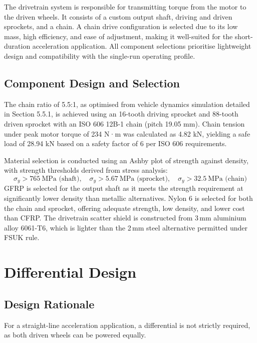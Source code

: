 \documentclass[11pt, a4paper]{report}
\numberwithin{equation}{section}
\begin{document}
\begin{refsection}
The drivetrain system is responsible for transmitting torque from the motor to the driven wheels. It consists of a custom output shaft, driving and driven sprockets, and a chain. A chain drive configuration is selected due to its low mass, high efficiency, and ease of adjustment, making it well-suited for the short-duration acceleration application. All component selections prioritise lightweight design and compatibility with the single-run operating profile.


\subsection{Component Design and Selection}

The chain ratio of 5.5:1, as optimised from vehicle dynamics simulation detailed in Section 5.5.1, is achieved using an 16-tooth driving sprocket and 88-tooth driven sprocket with an ISO 606 12B-1 chain (pitch 19.05 mm). Chain tension under peak motor torque of 234 N·m was calculated as 4.82 kN, yielding a safe load of 28.94 kN based on a safety factor of 6 per ISO 606 requirements\cite{iso606}.

Material selection is conducted using an Ashby plot of strength against density, with strength thresholds derived from stress analysis:
\begin{equation}
    \sigma_y > 765\ \text{MPa (shaft)}, \quad \sigma_y > 5.67\ \text{MPa (sprocket)}, \quad \sigma_y > 32.5\ \text{MPa (chain)}
\end{equation}
GFRP is selected for the output shaft as it meets the strength requirement at significantly lower density than metallic alternatives. Nylon 6 is selected for both the chain and sprocket, offering adequate strength, low density, and lower cost than CFRP. The drivetrain scatter shield is constructed from 3\,mm aluminium alloy 6061-T6, which is lighter than the 2\,mm steel alternative permitted under FSUK rule\cite{fs-ev-rules2026}.

\section{Differential Design}

\subsection{Design Rationale}

For a straight-line acceleration application, a differential is not strictly required, as both driven wheels can be powered equally.


\end{refsection}
\end{document}
